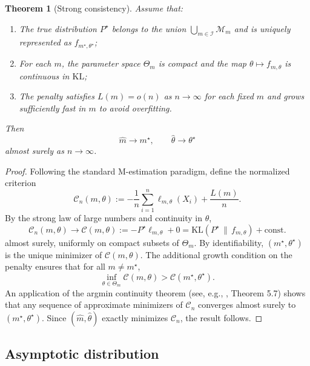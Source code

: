 \documentclass[12pt]{article}
\newtheorem{theorem}{Theorem}[section]
\numberwithin{equation}{section}
\begin{document}
	\begin{theorem}[Strong consistency]
		\label{thm:consistency-proof}
		Assume that:
		\begin{enumerate}
			\item The true distribution $P^{\star}$ belongs to the union
			$\bigcup_{m\in\mathcal{I}}\mathcal{M}_m$ and is uniquely
			represented as $f_{m^{\star},\theta^{\star}}$;
			\item For each $m$, the parameter space $\Theta_m$ is compact and
			the map $\theta\mapsto f_{m,\theta}$ is continuous in $\mathrm{KL}$;
			\item The penalty satisfies $L(m) = o(n)$ as $n\to\infty$ for each
			fixed $m$ and grows sufficiently fast in $m$ to avoid overfitting.
		\end{enumerate}
		Then
		\begin{equation}
			\widehat{m}\to m^{\star},\qquad
			\widehat{\theta}\to\theta^{\star}
		\end{equation}
		almost surely as $n\to\infty$.
	\end{theorem}
	
	\begin{proof}
		Following the standard M-estimation paradigm, define the normalized
		criterion
		\[
		\mathcal{C}_n(m,\theta)
		:= -\frac{1}{n}\sum_{i=1}^n \ell_{m,\theta}(X_i)
		+ \frac{L(m)}{n}.
		\]
		By the strong law of large numbers and continuity in $\theta$,
		\[
		\mathcal{C}_n(m,\theta)
		\to \mathcal{C}(m,\theta)
		:= - P^{\star}\ell_{m,\theta}
		+ 0
		= \mathrm{KL}(P^{\star}\,\|\,f_{m,\theta}) + \mathrm{const.}
		\]
		almost surely, uniformly on compact subsets of $\Theta_m$.
		By identifiability, $(m^{\star},\theta^{\star})$ is the unique minimizer
		of $\mathcal{C}(m,\theta)$.  The additional growth condition on the
		penalty ensures that for all $m\ne m^{\star}$,
		\[
		\inf_{\theta\in\Theta_m} \mathcal{C}(m,\theta)
		> \mathcal{C}(m^{\star},\theta^{\star}).
		\]
		An application of the argmin continuity theorem (see, e.g.,
		\citealp{vdVart1998}, Theorem 5.7) shows that any sequence of
		approximate minimizers of $\mathcal{C}_n$ converges almost surely
		to $(m^{\star},\theta^{\star})$.  Since $(\widehat{m},\widehat{\theta})$
		exactly minimizes $\mathcal{C}_n$, the result follows.
	\end{proof}
	
	\subsection{Asymptotic distribution}
	
\end{document}
